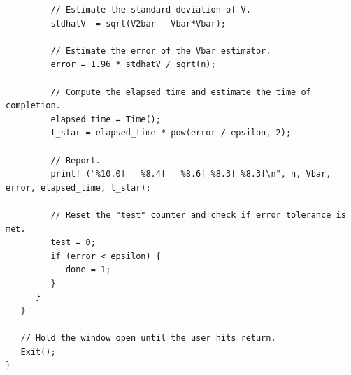 \documentclass{report}
\begin{document}
\begin{lstlisting}
         // Estimate the standard deviation of V.
         stdhatV  = sqrt(V2bar - Vbar*Vbar);

         // Estimate the error of the Vbar estimator.
         error = 1.96 * stdhatV / sqrt(n);

         // Compute the elapsed time and estimate the time of completion.
         elapsed_time = Time();
         t_star = elapsed_time * pow(error / epsilon, 2);

         // Report.
         printf ("%10.0f   %8.4f   %8.6f %8.3f %8.3f\n", n, Vbar, error, elapsed_time, t_star);

         // Reset the "test" counter and check if error tolerance is met.
         test = 0;
         if (error < epsilon) {
            done = 1;
         }
      }
   }

   // Hold the window open until the user hits return.
   Exit();
}
\end{lstlisting}
\pagebreak
\end{document}
